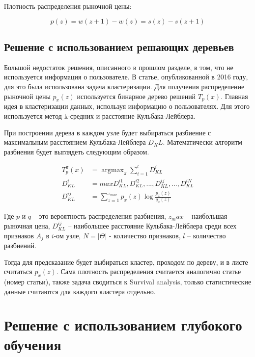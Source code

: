 \documentclass[times,specification,annotation]{itmo-student-thesis}
\DeclareMathOperator*{\argmax}{argmax}
\begin{document}
Плотность распределения рыночной цены:

\begin{equation}
    p(z)=w(z+1)-w(z)=s(z)-s(z+1)
\end{equation}

\subsection{Решение с использованием решающих деревьев}

Большой недостаток решения, описанного в прошлом разделе, в том, что не используется информация о пользователе. 
В статье, опубликованной в 2016 году, для это была использована задача кластеризации.
Для получения распределение рыночной цены $p_x (z)$ используется бинарное дерево решений $T_p (x)$. 
Главная идея в кластеризации данных, используя информацию о пользователях. 
Для этого используется метод k-средних и расстояние Кульбака-Лейблера.

При построении дерева в каждом узле будет выбираться разбиение с максимальным расстоянием Кульбака-Лейблера $D_KL$. 
Математически алгоритм разбиения будет выглядеть следующим образом.

\begin{equation}
    \begin{split}
        T_p^{\pi} (x) & = \argmax_{\pi} \sum_{i = 1}^l D_{KL}^i \\
        D_{KL}^i & = max {D_{KL}^{i1}, D_{KL}^{i2}, ..., D_{KL}^{ij}, ..., D_{KL}^{iN}} \\
        D_{KL}^{ij} & = \sum_{z = 1}^{z_{max}} p_x(z) \log \frac{p_x(z)}{q_x(z)}
    \end{split}
\end{equation}

Где $p$ и $q$ – это вероятность распределения разбиения, 
$z_max$ – наибольшая рыночная цена, 
$D_{KL}^{ij}$ – наибольшее расстояние Кульбака-Лейблера среди всех признаков $A_j$ в $i$-ом узле,
$N=  |\Theta|$ - количество признаков,
$l$ – количество разбиений.

Тогда для предсказание будет выбираться кластер, проходом по дереву, и в листе считаться $p_x (z)$.
Сама плотность распределения считается аналогично статье (номер статьи), 
также задача сводиться к Survival analysis, только статистические данные считаются для каждого кластера отдельно.

\section{Решение с использованием глубокого обучения}
\end{document}
